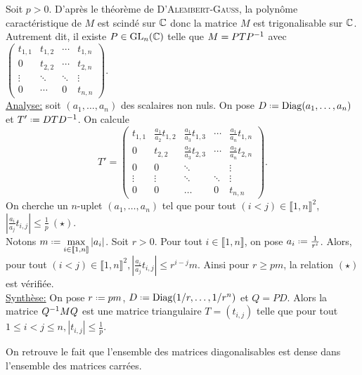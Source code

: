 \begin{solution}
    Soit $p > 0$. D'après le théorème de \textsc{D'Alembert}-\textsc{Gauss}, la polynôme caractéristique de $M$ est scindé sur $\mathbb{C}$ donc la matrice $M$ est trigonalisable sur $\mathbb{C}$. Autrement dit, il existe $P \in \mathrm{GL}_n(\mathbb{C})$ telle que $M = P T P^{-1}$ avec 
    $
    \begin{pmatrix}
        t_{1,1} & t_{1,2} & \cdots & t_{1,n} \\
        0 & t_{2,2} & \cdots & t_{2,n} \\
        \vdots & \ddots & \ddots & \vdots \\
        0 & \cdots & 0 & t_{n,n}
    \end{pmatrix}. 
    $ \\
    \underline{Analyse:} soit $(a_1, \dots, a_n)$ des scalaires non nuls. On pose $D \defeq \Diag(a_1, \dots, a_n)$ et $T' \defeq D T \Inv{D}$. On calcule
    $$T'=
    \begin{pmatrix}
        t_{1,1} & \frac{a_1}{a_2}t_{1,2} & \frac{a_1}{a_3} t_{1,3} & \cdots & \frac{a_1}{a_n} t_{1,n} \\
        0 & t_{2,2} & \frac{a_2}{a_3}t_{2,3} & \cdots & \frac{a_2}{a_n} t_{2,n} \\
        0 & 0 & \ddots & & \vdots \\
        \vdots & \vdots & \ddots & \ddots & \vdots \\
        0 & 0 & \dots & 0 & t_{n,n}
    \end{pmatrix}.
    $$
    On cherche un $n$-uplet $(a_1, \dots, a_n)$ tel que pour tout $(i < j) \in \llbracket 1, n \rrbracket^2$, $\left| \frac{a_i}{a_j}t_{i,j} \right| \leqslant \frac{1}{p} \ (\star)$. \\
    Notons $m \defeq \max\limits_{i \in \llbracket 1, n \rrbracket} |a_i|$.
    Soit $r > 0$. Pour tout $i \in \llbracket 1, n \rrbracket$, on pose $a_i \defeq \frac{1}{r^i}$. Alors, pour tout $(i < j) \in \llbracket 1, n \rrbracket^2, \left| \frac{a_i}{a_j} t_{i,j} \right| \leqslant r^{i-j}m$. Ainsi pour $r \geqslant pm$, la relation $(\star)$ est vérifiée. \\
    \underline{Synthèse:} On pose $r \defeq pm$, $D \defeq \Diag(1/r, \dots, 1/r^n)$ et $Q = PD$. Alors la matrice $Q^{-1} M Q$ est une matrice triangulaire $T = (t_{i,j})$ telle que pour tout $1 \leqslant i < j \leqslant n, |t_{i,j}| \leqslant \frac{1}{p}$.
\end{solution}

\begin{remarque}
    On retrouve le fait que l'ensemble des matrices diagonalisables est dense dans l'ensemble des matrices carrées.
\end{remarque}


